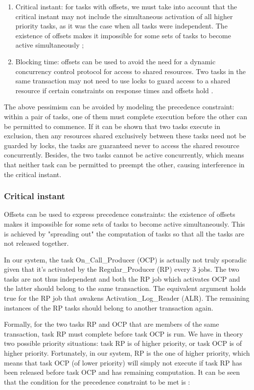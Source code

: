 \documentclass{article}
\begin{document}
\begin{enumerate}
   \item Critical instant: for tasks with offsets, we must take into account that the critical instant may not include the simultaneous activation of all higher priority tasks, as it was the case when all tasks were independent. The existence of offsets makes it impossible for some sets of tasks to become active simultaneously \cite{pessimistic-rma};
   \item Blocking time: offsets can be used to avoid the need for a dynamic concurrency control protocol for access to shared resources. Two tasks in the same transaction may not need to use locks to guard access to a shared resource if certain constraints on response times and offsets hold \cite{tindell-offsets}.
\end{enumerate}

The above pessimism can be avoided by modeling the precedence constraint: within a pair of tasks, one of them must complete execution before the other can be permitted to commence. If it can be shown that two tasks execute in exclusion, then any resources shared exclusively between these tasks need not be guarded by locks, the tasks are guaranteed never to access the shared resource concurrently. Besides, the two tasks cannot be active concurrently, which means that neither task can be permitted to preempt the other, causing interference in the critical instant.

\subsubsection{Critical instant}

Offsets can be used to express precedence constraints: the existence of offsets makes it impossible for some sets of tasks to become active simultaneously. This is achieved by "spreading out" the computation of tasks so that all the tasks are not released together.

In our system, the task On\_Call\_Producer (OCP) is actually not truly sporadic given that it's activated by the Regular\_Producer (RP) every 3 jobs. The two tasks are not thus independent and both the RP job which activates OCP and the latter should belong to the same transaction. The equivalent argument holds true for the RP job that awakens Activation\_Log\_Reader (ALR). The remaining instances of the RP tasks should belong to another transaction again.

Formally, for the two tasks RP and OCP that are members of the same transaction, task RP must complete before task OCP is run. We have in theory two possible priority situations: task RP is of higher priority, or task OCP is of higher priority. Fortunately, in our system, RP is the one of higher priority, which means that task OCP (of lower priority) will simply not execute if task RP has been released before task OCP and has remaining computation. It can be seen that the condition for the precedence constraint to be met is \cite{tindell-offsets}:
\end{document}
